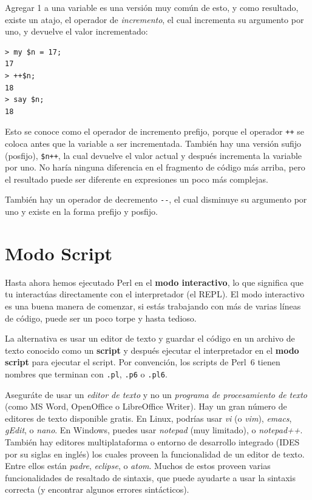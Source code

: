 Agregar 1 a una variable es una versión muy común de esto, 
y como resultado, existe un atajo, el operador de \emph{incremento},
el cual incrementa su argumento por uno, y devuelve el valor incrementado: 

\begin{verbatim}
> my $n = 17;
17
> ++$n;
18
> say $n;
18
\end{verbatim}
%
Esto se conoce como el operador de incremento prefijo, porque el operador \verb|++|
se coloca antes que la variable a ser incrementada. También hay una versión sufijo (posfijo),
\verb|$n++|, la cual devuelve el valor actual y después incrementa la variable por uno. 
No haría ninguna diferencia en el fragmento de código más arriba, pero el resultado puede
ser diferente en expresiones un poco más complejas.

También hay un operador de decremento \verb|--|, el cual disminuye 
su argumento por uno y existe en la forma prefijo y posfijo. 



\section{Modo Script}

Hasta ahora hemos ejecutado Perl  en el {\bf modo interactivo}, lo que 
significa que tu interactúas directamente con el interpretador (el REPL).
El modo interactivo es una buena manera de comenzar, si estás trabajando 
con más de varias líneas de código, puede ser un poco torpe y hasta tedioso.

La alternativa es usar un editor de texto y guardar el código en un archivo de 
texto conocido como un {\bf script} y después ejecutar el interpretador en el 
{\bf modo script} para ejecutar el script. Por convención, los scripts de Perl~6 
tienen nombres que terminan con {\tt .pl}, {\tt .p6} o {\tt .pl6}.

Aseguráte de usar un \emph{editor de texto} y no un \emph{programa de procesamiento de texto}
(como MS Word, OpenOffice o LibreOffice Writer). Hay un gran número de editores
de texto disponible gratis. En Linux, podrías usar \emph{vi} (o \emph{vim}), 
\emph{emacs}, \emph{gEdit}, o \emph{nano}. En Windows, puedes usar \emph{notepad} (muy limitado),
o \emph{notepad++}. También hay editores multiplataforma o entorno de desarrollo integrado
(IDES por su siglas en inglés) los cuales proveen la funcionalidad de un editor de texto. 
Entre ellos están \emph{padre}, \emph{eclipse}, o \emph{atom}. Muchos de estos proveen 
varias funcionalidades de resaltado de sintaxis, que puede ayudarte a usar 
la sintaxis correcta (y encontrar algunos errores sintácticos).

